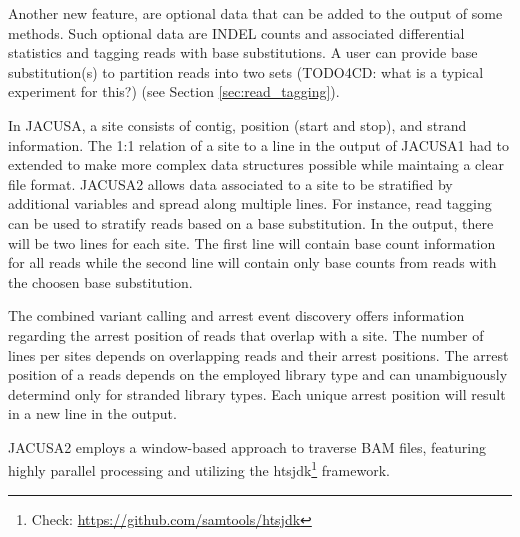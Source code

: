 \documentclass[10pt,a4paper,final]{article}
\begin{document}
Another new feature, are optional data that can be added to the output of some methods.
Such optional data are INDEL counts and associated differential statistics and tagging reads with base substitutions. 
A user can provide base substitution(s) to partition reads into two sets (TODO4CD: what is a typical experiment for this?) 
(see Section \ref{sec:read_tagging}). 

In JACUSA, a site consists of contig, position (start and stop), and strand information.
The 1:1 relation of a site to a line in the output of JACUSA1 had to extended to make more complex data 
structures possible while maintaing a clear file format. JACUSA2 allows data associated to 
a site to be stratified by additional variables and spread along multiple lines.  For instance, 
read tagging can be used to stratify reads based on a base substitution. 
In the output, there will be two lines for each site. The first line will contain base count information 
for all reads while the second line will contain only base counts from reads with the choosen base substitution. 

The combined variant calling and arrest event discovery \lrtarrest offers information regarding the 
arrest position of reads that overlap with a site. The number of lines per sites depends on overlapping 
reads and their arrest positions. The arrest position of a reads depends on the employed library type and 
can unambiguously determind only for stranded library types. Each unique arrest position will result in a
new line in the output. 

JACUSA2 employs a window-based approach to traverse BAM \cite{HengLi2009} files, featuring highly
parallel processing and utilizing the htsjdk\footnote{Check: \url{https://github.com/samtools/htsjdk}} 
framework.
\end{document}
